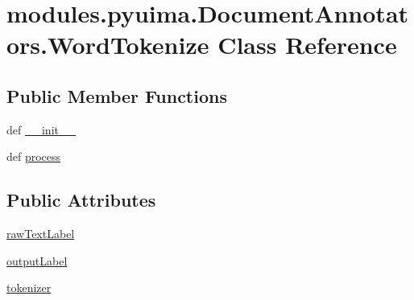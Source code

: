 \hypertarget{classmodules_1_1pyuima_1_1DocumentAnnotators_1_1WordTokenize}{\section{modules.\-pyuima.\-Document\-Annotators.\-Word\-Tokenize \-Class \-Reference}
\label{classmodules_1_1pyuima_1_1DocumentAnnotators_1_1WordTokenize}
}
\subsection*{\-Public \-Member \-Functions}
\begin{DoxyCompactItemize}
\item 
def \hyperlink{classmodules_1_1pyuima_1_1DocumentAnnotators_1_1WordTokenize_a5561d74c64545ba6ee0b10d62ad5ba8c}{\-\_\-\-\_\-init\-\_\-\-\_\-}
\item 
def \hyperlink{classmodules_1_1pyuima_1_1DocumentAnnotators_1_1WordTokenize_a81c6b03ebd0011847d1baccd450e1268}{process}
\end{DoxyCompactItemize}
\subsection*{\-Public \-Attributes}
\begin{DoxyCompactItemize}
\item 
\hyperlink{classmodules_1_1pyuima_1_1DocumentAnnotators_1_1WordTokenize_ae5c98fe6cf86b6bf462b1c9d5519b68f}{raw\-Text\-Label}
\item 
\hyperlink{classmodules_1_1pyuima_1_1DocumentAnnotators_1_1WordTokenize_adb3a3c89f1d0545a9dc8e40e3a1a2706}{output\-Label}
\item 
\hyperlink{classmodules_1_1pyuima_1_1DocumentAnnotators_1_1WordTokenize_a46e06b6a353e33da3738bdef4f822a6e}{tokenizer}
\end{DoxyCompactItemize}


